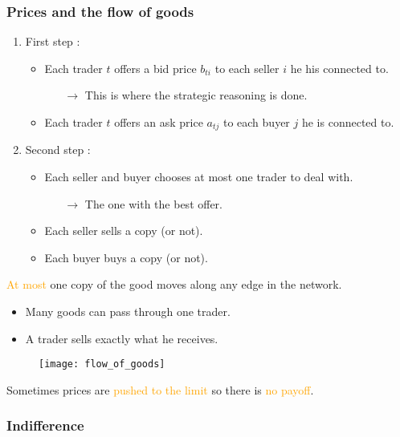 \subsubsection{Prices and the flow of goods}

\begin{enumerate}
\item First step :
	\begin{itemize}
	\item Each trader $t$ offers a bid price $b_{ti}$ to each seller $i$ he his connected to.
		\begin{itemize}
		\item[$\rightarrow$] This is where the strategic reasoning is done.
		\end{itemize}
	\item Each trader $t$ offers an ask price $a_{tj}$ to each buyer $j$ he is connected to.
	\end{itemize}
\item Second step :
	\begin{itemize}
	\item Each seller and buyer chooses at most one trader to deal with.
		\begin{itemize}
		\item[$\rightarrow$] The one with the best offer.
		\end{itemize}
	\item Each seller sells a copy (or not).
	\item Each buyer buys a copy (or not).
	\end{itemize}
\end{enumerate}

\newpage
\textcolor{orange}{At most} one copy of the good moves along any edge in the network.

\begin{itemize}
\item Many goods can pass through one trader.
\item A trader sells exactly what he receives.
\end{itemize}

\begin{figure}[H]
    \centering
    \texttt{[image: flow\_of\_goods]}
\end{figure}

Sometimes prices are \textcolor{orange}{pushed to the limit} so there is \textcolor{orange}{no payoff}.

\subsubsection{Indifference}

